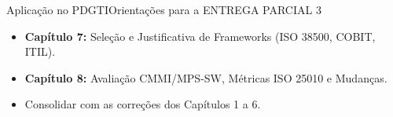 \begin{senaiframe}{Aplicação no PDGTI}{Orientações para a ENTREGA PARCIAL 3}
  \vspace{0.2cm}
  \begin{tcolorbox}[senaigreencard, title={Entrega Parcial 3 (Capítulos 7 e 8) – Data: 30/Out}]
    \begin{itemize}
      \item \textbf{Capítulo 7:} Seleção e Justificativa de Frameworks (ISO 38500, COBIT, ITIL).
      \item \textbf{Capítulo 8:} Avaliação CMMI/MPS-SW, Métricas ISO 25010 e Mudanças.
      \item Consolidar com as correções dos Capítulos 1 a 6.
    \end{itemize}
  \end{tcolorbox}
\end{senaiframe}
